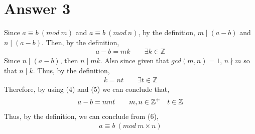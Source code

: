 \documentclass[12pt]{article}
\newcommand{\Z}{\mathbb{Z}}
\begin{document}
\section*{Answer 3}
Since $a \equiv b \ (mod \ m)$ and $a \equiv b \ (mod \ n)$, by the definition, $m \mid (a-b)$ and $n \mid (a-b)$. Then, by the definition, \\
\begin{equation}
\begin{split}
 a-b = mk \qquad \exists k \in \Z
\end{split}
\end{equation}
Since $n \mid (a-b)$, then $n \mid mk$. Also since given that $gcd(m,n) = 1$, $n \nmid m$ so that $n \mid k$. Thus, by the definition,\\
\begin{equation}
\begin{split}
k = nt \qquad \exists t \in \Z
\end{split}
\end{equation}
Therefore, by using (4) and (5) we can conclude that,
\begin{equation}
\begin{split}
a-b = mnt \qquad m,n\in \Z\textsuperscript{+} \quad t\in \Z
\end{split}
\end{equation}
Thus, by the definition, we can conclude from (6),
\begin{equation*}
\begin{split}
a \equiv b \ (mod \ m\times n)
\end{split}
\end{equation*}
\end{document}
